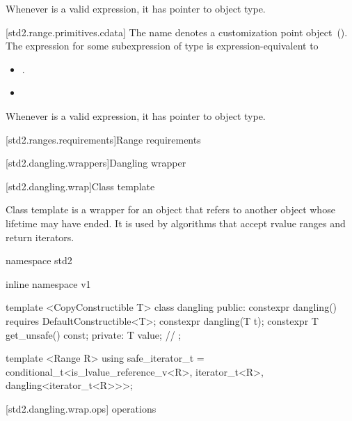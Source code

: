 \pnum
\enternote Whenever  is a valid expression, it
has pointer to object type. \exitnote

[std2.range.primitives.cdata]{}
\pnum
The name  denotes a customization point
object~(). The expression
 for some subexpression  of type 
is expression-equivalent to\added{:}
\begin{itemize}
\item
  .
\item
\end{itemize}

\pnum
{}

\pnum
\enternote Whenever  is a valid expression, it
has pointer to object type. \exitnote

[std2.ranges.requirements]{Range requirements}


[std2.dangling.wrappers]{Dangling wrapper}

[std2.dangling.wrap]{Class template }

\pnum
{}%
Class template  is a wrapper for an object that refers to another object whose
lifetime may have ended. It is used by algorithms that accept rvalue ranges and return iterators.

\begin{codeblock}
namespace std2 { inline namespace v1 {
  template <CopyConstructible T>
  class dangling {
  public:
    constexpr dangling() requires DefaultConstructible<T>;
    constexpr dangling(T t);
    constexpr T get_unsafe() const;
  private:
    T value; // \expos
  };

  template <Range R>
  using safe_iterator_t =
    conditional_t<is_lvalue_reference_v<R>,
      iterator_t<R>,
      dangling<iterator_t<R>>>;
}}
\end{codeblock}

[std2.dangling.wrap.ops]{ operations}

